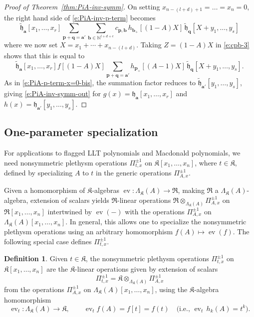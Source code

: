 \documentclass[12pt]{amsart}
\theoremstyle{definition}
\newtheorem{defn}[thm]{Definition}
\theoremstyle{remark}
\newcommand{\NN}{{\mathbb N}}
\newcommand{\aA}{{\mathbf a}}
\newcommand{\bb}{{\mathbf b}}
\newcommand{\pp}{{\mathbf p}}
\newcommand{\qq}{{\mathbf q}}
\newcommand{\fh}{{\mathfrak h}}
\newcommand{\tfh}{{\widetilde{\mathfrak h}}}
\newcommand{\Kfrak}{{\mathfrak K}}
\newcommand{\Rfrak}{{\mathfrak R}}
\DeclareMathOperator{\ev}{ev}
\begin{document}
\begin{proof}[Proof of Theorem~\ref{thm:PiA-inv-symm}]
On setting $x_{n-(l+d)+1} = \ldots = x_{n} = 0$, the right hand side
of \eqref{e:PiA-inv-p-term} becomes
\begin{equation}\label{e:PiA-inv-p-term-x=0}
\tfh _{\aA }[x_{1},\ldots,x_{r}] \sum _{\pp +\qq =\aA '}\sum _{\bb
\in \NN ^{l+d+e}} c_{\pp ,\bb }\, h_{\bb_+}[(1-A)X]\, \tfh _{\qq }
[X + y_{1}, \ldots, y_{s}]
\end{equation}
where we now set $X = x_{1}+\cdots +x_{n-(l+d)}$.  Taking $Z = (1-A)X$
in \eqref{e:cpb-3} shows that this is equal to
\begin{equation}\label{e:PiA-inv-p-term-x=0-bis}
\tfh _{\aA }[x_{1},\ldots,x_{r}] f[(1-A)X] \sum _{\pp +\qq =\aA '}
h_{\pp _{+}}[(A-1)X]\, \tfh _{\qq } [X + y_{1}, \ldots, y_{s}].
\end{equation}
As in \eqref{e:PiA-p-term-x=0-bis}, the summation factor reduces to
$\tfh _{\aA '}[y_{1},\ldots,y_{s}]$, giving
\eqref{e:PiA-inv-symm-out} for $g(x) = \fh_{\aA }[x_{1},\ldots,x_{r}]$
and $h(x) = \fh_{\aA '}[y_{1},\ldots,y_{s}]$.
\end{proof}


\subsection{One-parameter specialization}
\label{ss:A=t}


For applications to flagged LLT polynomials and Macdonald polynomials,
we need nonsymmetric plethysm operations $\Pi _{t,x}^{\pm 1}$ on
$\Kfrak [x_{1},\ldots,x_{n}]$, where $t\in \Kfrak $, defined by
specializing $A$ to $t$ in the generic operations $\Pi _{A,x}^{\pm
1}$.

Given a homomorphism of $\Kfrak $-algebras $\ev \colon \Lambda
_{\Kfrak }(A)\rightarrow \Rfrak $, making $\Rfrak $ a $\Lambda
_{\Kfrak }(A)$-algebra, extension of scalars yields $\Rfrak $-linear
operations ${\Rfrak \otimes _{\Lambda _{\Kfrak }(A)} \Pi _{A,x}^{\pm
1}}$ on $\Rfrak [x_{1},\ldots,x_{n}]$ intertwined by $\ev (-)$ with
the operations $\Pi _{A,x}^{\pm 1}$ on $\Lambda _{\Kfrak
}(A)[x_{1},\ldots,x_{n}]$.  In general, this allows one to specialize
the nonsymmetric plethysm operations using an arbitrary homomorphism
$f(A)\mapsto \ev (f)$.  The following special case defines $\Pi
_{t,x}^{\pm 1}$.

\begin{defn}\label{def:Pit}
Given $t\in \Kfrak $, the nonsymmetric plethysm operations $\Pi
_{t,x}^{\pm 1}$ on $\Kfrak [x_{1},\ldots,x_{n}]$ are the $\Kfrak
$-linear operations given by extension of scalars
\begin{equation}\label{e:Pit-def}
\Pi _{t,x}^{\pm 1} = \Kfrak \otimes _{\Lambda _{\Kfrak }(A)} \Pi
_{A,x}^{\pm 1}
\end{equation}
from the operations $\Pi _{A,x}^{\pm 1}$ on $\Lambda _{\Kfrak
}(A)[x_{1},\ldots,x_{n}]$, using the $\Kfrak $-algebra homomorphism
\begin{equation}\label{e:ev-t}
\ev _{t} \colon \Lambda _{\Kfrak }(A) \rightarrow \Kfrak,\qquad \ev
_{t}f(A) = f[t] = f(t) \quad \text{(i.e., $\ev _{t}\, h_{k}(A) =
t^{k}$)}.
\end{equation}
\end{defn}
\end{document}
